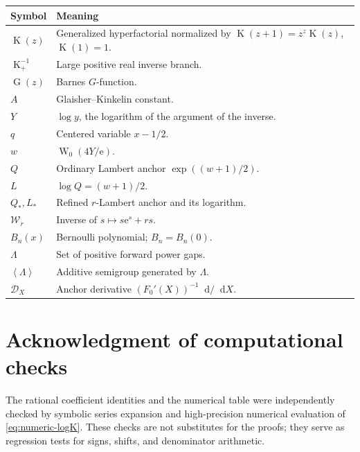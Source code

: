 \documentclass[11pt,oneside]{article}
\theoremstyle{plain}
\theoremstyle{definition}
\theoremstyle{remark}
\newcommand{\Kfun}{\operatorname{K}}
\newcommand{\Gfun}{\operatorname{G}}
\newcommand{\W}{\operatorname{W}}
\newcommand{\rW}{\mathcal{W}}
\newcommand{\e}{\mathrm{e}}
\newcommand{\dd}{\mathop{}\!\mathrm{d}}
\newcommand{\calD}{\mathcal{D}}
\newcommand{\angles}[1]{\left\langle #1\right\rangle}
\begin{document}
\begin{longtable}{@{}p{}p{}@{}}
\toprule
Symbol & Meaning\\
\midrule
\endhead
\(\Kfun(z)\) & Generalized hyperfactorial normalized by
\(\Kfun(z+1)=z^z\Kfun(z)\), \(\Kfun(1)=1\).\\
\(\Kfun_+^{-1}\) & Large positive real inverse branch.\\
\(\Gfun(z)\) & Barnes \(G\)-function.\\
\(A\) & Glaisher--Kinkelin constant.\\
\(Y\) & \(\log y\), the logarithm of the argument of the inverse.\\
\(q\) & Centered variable \(x-1/2\).\\
\(w\) & \(\W_0(4Y/\e)\).\\
\(Q\) & Ordinary Lambert anchor \(\exp((w+1)/2)\).\\
\(L\) & \(\log Q=(w+1)/2\).\\
\(Q_*,L_*\) & Refined \(r\)-Lambert anchor and its logarithm.\\
\(\rW_r\) & Inverse of \(s\mapsto s\e^s+rs\).\\
\(B_n(x)\) & Bernoulli polynomial; \(B_n=B_n(0)\).\\
\(\Lambda\) & Set of positive forward power gaps.\\
\(\angles{\Lambda}\) & Additive semigroup generated by \(\Lambda\).\\
\(\calD_X\) & Anchor derivative \((F_0'(X))^{-1}\dd/\dd X\).\\
\bottomrule
\end{longtable}

\section*{Acknowledgment of computational checks}

The rational coefficient identities and the numerical table were independently
checked by symbolic series expansion and high-precision numerical evaluation of
\eqref{eq:numeric-logK}.  These checks are not substitutes for the proofs; they
serve as regression tests for signs, shifts, and denominator arithmetic.
\end{document}
